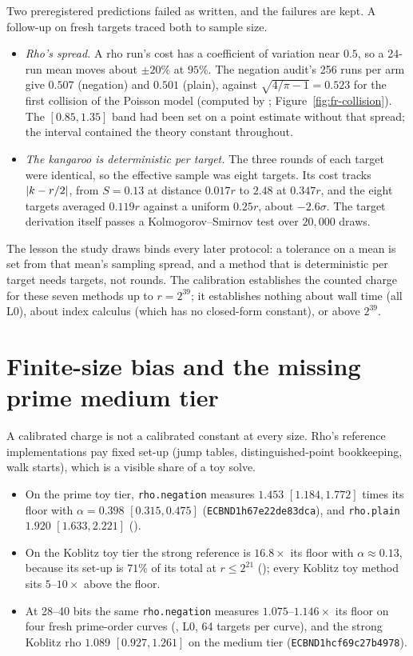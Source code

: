 Two preregistered predictions failed as written, and the failures are kept.
A follow-up on fresh targets traced both to sample size.
\begin{itemize}
\item \emph{Rho's spread.} A rho run's cost has a coefficient of
  variation near $0.5$, so a 24-run mean moves about $\pm20\%$ at $95\%$.
  The negation audit's 256 runs per arm give $0.507$ (negation) and $0.501$
  (plain), against $\sqrt{4/\pi-1}=0.523$ for the first collision of the
  Poisson model (computed by ;
  Figure~\ref{fig:fr-collision}).
  The $[0.85,1.35]$ band had been set on a point estimate without that
  spread; the interval contained the theory constant throughout.
\item \emph{The kangaroo is deterministic per target.} The three rounds of
  each target were identical, so the effective sample was eight targets.
  Its cost tracks $\lvert k-r/2 \rvert$, from $S=0.13$ at distance $0.017r$ to $2.48$
  at $0.347r$, and the eight targets averaged $0.119r$ against a uniform
  $0.25r$, about $-2.6\sigma$. The target derivation itself passes a
  Kolmogorov--Smirnov test over $20{,}000$ draws.
\end{itemize}
The lesson the study draws binds every later protocol: a tolerance on a
mean is set from that mean's sampling spread, and a method that is
deterministic per target needs targets, not rounds. The calibration
establishes the counted charge for these seven methods up to $r=2^{39}$; it
establishes nothing about wall time (all L0), about index calculus (which
has no closed-form constant), or above $2^{39}$.

\section{Finite-size bias and the missing prime medium tier}\label{sec:mr-bias}

A calibrated charge is not a calibrated constant at every size. Rho's
reference implementations pay fixed set-up (jump tables, distinguished-point
bookkeeping, walk starts), which is a visible share of a toy solve.
\begin{itemize}
\item On the prime toy tier, \texttt{rho.negation} measures $1.453$
  $[1.184,1.772]$ times its floor with $\alpha=0.398$ $[0.315,0.475]$
  (\texttt{ECBND1h67e22de83dca}), and \texttt{rho.plain} $1.920$
  $[1.633,2.221]$ ().
\item On the Koblitz toy tier the strong reference is $16.8\times$ its floor
  with $\alpha\approx0.13$, because its set-up is $71\%$ of its total at
  $r\le2^{21}$ (); every
  Koblitz toy method sits $5$--$10\times$ above the floor.
\item At 28--40 bits the same \texttt{rho.negation} measures
  $1.075$--$1.146\times$ its floor on four fresh prime-order curves
  (, L0, 64 targets per curve),
  and the strong Koblitz rho $1.089$ $[0.927,1.261]$ on the medium tier
  (\texttt{ECBND1hcf69c27b4978}).
\end{itemize}
